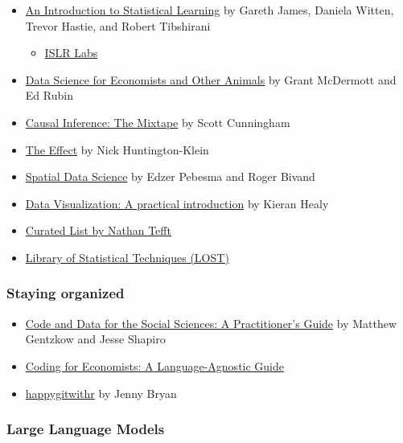 \documentclass[11pt]{article}
\begin{document}
\begin{itemize}
    \item \href{https://statlearning.com}{An Introduction to Statistical Learning} by Gareth James, Daniela Witten, Trevor Hastie, and Robert Tibshirani
    \begin{itemize}
        \item \href{https://emilhvitfeldt.github.io/ISLR-tidymodels-labs/}{ISLR Labs}
    \end{itemize}
    \item \href{https://grantmcdermott.com/ds4e/}{Data Science for Economists and Other Animals} by Grant McDermott and Ed Rubin
    \item \href{https://mixtape.scunning.com/}{Causal Inference: The Mixtape} by Scott Cunningham
    \item \href{https://www.theeffectbook.net/}{The Effect} by Nick Huntington-Klein
    \item \href{https://r-spatial.org/book/}{Spatial Data Science} by Edzer Pebesma and Roger Bivand
    \item \href{http://socviz.co/}{Data Visualization: A practical introduction} by Kieran Healy
    \item \href{https://docs.google.com/spreadsheets/d/1yLNdpb0TkYfNN-phme1Amt4XPU1bOB6vINHam1ss_fk/edit#gid=1544370596}{Curated List by Nathan Tefft}
    \item \href{https://lost-stats.github.io/}{Library of Statistical Techniques (LOST)}
\end{itemize}

\subsubsection*{Staying organized}

\begin{itemize}
    \item \href{https://web.stanford.edu/~gentzkow/research/CodeAndData.pdf}{Code and Data for the Social Sciences: A Practitioner's Guide} by Matthew Gentzkow and Jesse Shapiro
    \item \href{https://scholar.harvard.edu/sites/scholar.harvard.edu/files/ristovska/files/coding_for_econs_20190221.pdf}{Coding for Economists: A Language-Agnostic Guide}
    \item \href{https://happygitwithr.com/}{happygitwithr} by Jenny Bryan
\end{itemize}

\subsubsection*{Large Language Models}
\end{document}
